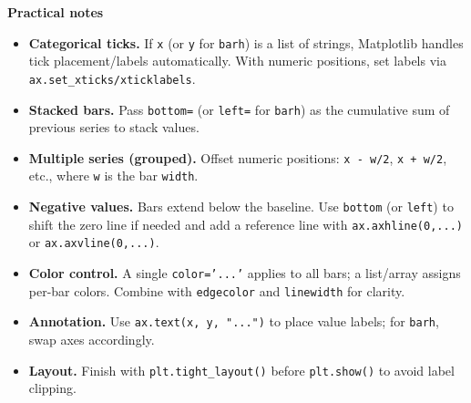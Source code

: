 \textbf{Practical notes}
\begin{itemize}
    \item \textbf{Categorical ticks.} If \texttt{x} (or \texttt{y} for \texttt{barh}) is a list of strings, Matplotlib handles tick placement/labels automatically. With numeric positions, set labels via \texttt{ax.set\_xticks/xticklabels}.
    \item \textbf{Stacked bars.} Pass \texttt{bottom=} (or \texttt{left=} for \texttt{barh}) as the cumulative sum of previous series to stack values.
    \item \textbf{Multiple series (grouped).} Offset numeric positions: \texttt{x - w/2}, \texttt{x + w/2}, etc., where \texttt{w} is the bar \texttt{width}.
    \item \textbf{Negative values.} Bars extend below the baseline. Use \texttt{bottom} (or \texttt{left}) to shift the zero line if needed and add a reference line with \texttt{ax.axhline(0,...)} or \texttt{ax.axvline(0,...)}.
    \item \textbf{Color control.} A single \texttt{color='...'} applies to all bars; a list/array assigns per-bar colors. Combine with \texttt{edgecolor} and \texttt{linewidth} for clarity.
    \item \textbf{Annotation.} Use \texttt{ax.text(x, y, "...")} to place value labels; for \texttt{barh}, swap axes accordingly.
    \item \textbf{Layout.} Finish with \texttt{plt.tight\_layout()} before \texttt{plt.show()} to avoid label clipping.
\end{itemize}


